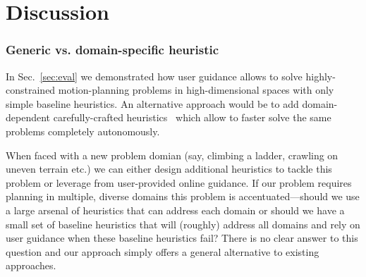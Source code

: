 \documentclass{article}
\begin{document}
\section{Discussion}
\label{sec:future}

\subsubsection{Generic vs. domain-specific heuristic}
In Sec.~\ref{sec:eval} we demonstrated how user guidance allows to solve highly-constrained motion-planning problems in high-dimensional spaces with only simple baseline heuristics.
An alternative approach would be to add domain-dependent carefully-crafted heuristics~\cite{V17} which allow to faster solve the same problems completely autonomously.

When faced with a new problem domian 
(say, climbing a ladder, crawling on uneven terrain etc.)
we can either design additional heuristics to tackle this problem or leverage from user-provided online guidance.
If our problem requires planning in multiple, diverse domains this problem is accentuated---should we  use a large arsenal of heuristics that can address each domain or should we have a small set of baseline heuristics that will (roughly) address all domains and rely on user guidance when these baseline heuristics fail?
There is no clear answer to this question and our approach simply offers a general alternative to existing approaches.
\end{document}
